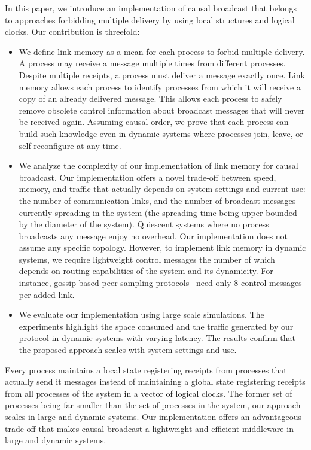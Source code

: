 In this paper, we introduce an implementation of causal broadcast that belongs
to approaches forbidding multiple delivery by using local structures and
logical clocks.
Our contribution is threefold:
\begin{itemize}[leftmargin=*]
\item We define link memory as a mean for each process to forbid multiple
  delivery. A process may receive a message multiple times from different
  processes. Despite multiple receipts, a process must deliver a message exactly
  once.  Link memory allows each process to identify processes from which it
  will receive a copy of an already delivered message. This allows each process
  to safely remove obsolete control information about broadcast messages that
  will never be received again. Assuming causal order, we prove that each
  process can build such knowledge even in dynamic systems where processes join,
  leave, or self-reconfigure at any time.
\item We analyze the complexity of our implementation of link memory for causal
  broadcast. Our implementation offers a novel trade-off between speed, memory,
  and traffic that actually depends on system settings and current use: the
  number of communication links, and the number of broadcast messages currently
  spreading in the system (the spreading time being upper bounded by the
  diameter of the system). Quiescent systems where no process broadcasts any
  message enjoy no overhead. Our implementation does not assume any specific
  topology. However, to implement link memory in dynamic systems, we require
  lightweight control messages the number of which depends on routing
  capabilities of the system and its dynamicity.  For instance, gossip-based
  peer-sampling
  protocols~\cite{jelasity2007gossip,jelasity2009tman,nedelec2017adaptive} need
  only 8 control messages per added link.
\item We evaluate our implementation using large scale simulations. The
  experiments highlight the space consumed and the traffic generated by our
  protocol in dynamic systems with varying latency. The results confirm that the
  proposed approach scales with system settings and use.
\end{itemize}
Every process maintains a local state registering receipts from processes that
actually send it messages instead of maintaining a global state registering
receipts from all processes of the system in a vector of logical clocks. The
former set of processes being far smaller than the set of processes in the
system, our approach scales in large and dynamic systems.  Our implementation
offers an advantageous trade-off that makes causal broadcast a lightweight and
efficient middleware in large and dynamic systems.

